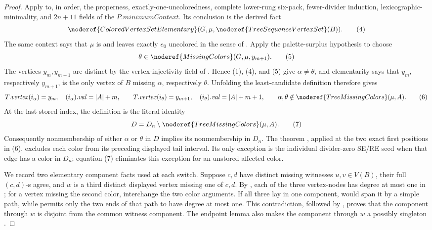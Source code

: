 \begin{proof}
Apply  to, in order,
the properness, exactly-one-uncoloredness, complete lower-rung six-pack,
fewer-divider induction, lexicographic-minimality, and \(2n+11\) fields of
the 
\(P.\mathit{minimumContext}\).  Its conclusion is the derived fact
\[
       \noderef{ColoredVertexSetElementary}
         (G,\mu,\noderef{TreeSequenceVertexSet}(B)).             \tag{4}
\]
The same context says that \(\mu\) is
 and leaves exactly \(e_0\) uncolored in the
sense of .  Apply the palette-surplus hypothesis
to choose
\[
                 \theta\in\noderef{MissingColors}(G,\mu,y_{m+1}). \tag{5}
\]
The vertices \(y_m,y_{m+1}\) are distinct by the vertex-injectivity field of
.  Hence (1), (4), and (5) give
\(\alpha\ne\theta\), and elementarity says that \(y_m\), respectively
\(y_{m+1}\), is the only vertex of \(B\) missing \(\alpha\), respectively
\(\theta\).  Unfolding the least-candidate definition
 therefore gives
\[
 T.\mathit{vertex}(i_\alpha)=y_m,\quad
 (i_\alpha).\mathit{val}=|A|+m,\qquad
 T.\mathit{vertex}(i_\theta)=y_{m+1},\quad
 (i_\theta).\mathit{val}=|A|+m+1,
 \qquad
 \alpha,\theta\notin\noderef{TreeMissingColors}(\mu,A).         \tag{6}
\]
At the last stored index, the definition is the literal identity
\[
 D=D_n\setminus\noderef{TreeMissingColors}(\mu,A).              \tag{7}
\]
Consequently nonmembership of either \(\alpha\) or \(\theta\) in \(D\)
implies its nonmembership in \(D_n\).  The theorem
, applied at the two exact
first positions in (6), excludes each color from its preceding displayed
tail interval.  Its only exception is the individual divider-zero SE/RE
seed when that edge has a color in \(D_n\); equation (7) eliminates this
exception for an unstored affected color.

We record two elementary component facts used at each switch.  Suppose
\(c,d\) have distinct missing witnesses \(u,v\in V(B)\), their full
\((c,d)\)-s agree, and \(w\) is a third distinct displayed vertex
missing one of \(c,d\).  By
, each of the three vertex-nodes has
degree at most one in ; for a vertex
missing the second color, interchange the two color arguments.  If all
three lay in one component,  would
span it by a simple path, while
 permits only the two ends of
that path to have degree at most one.  This contradiction, followed by
, proves that the component through
\(w\) is disjoint from the common witness component.  The endpoint lemma
also makes the component through \(w\) a possibly singleton
.


\end{proof}
